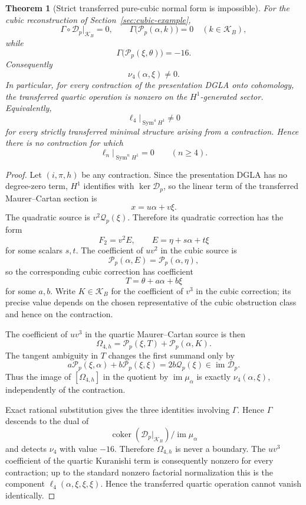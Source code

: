 \documentclass[11pt]{amsart}
\newtheorem{theorem}{Theorem}[section]
\newcommand{\coker}{\operatorname{coker}}
\newcommand{\cD}{\mathscr D}
\newcommand{\cQ}{\mathscr Q}
\newcommand{\cP}{\mathscr P}
\begin{document}
\begin{theorem}[Strict transferred pure-cubic normal form is impossible]\label{thm:strict-transfer-no-go}
For the cubic reconstruction of Section~\ref{sec:cubic-example},
\[
\Gamma\circ\cD_p|_{\mathcal K_B}=0,
\qquad
\Gamma\bigl(\cP_p(\alpha,k)\bigr)=0
\quad(k\in\mathcal K_B),
\]
while
\[
\boxed{
\Gamma\bigl(\cP_p(\xi,\theta)\bigr)=-16.
}
\]
Consequently
\[
\boxed{
\nu_4(\alpha,\xi)\ne0.
}
\]
In particular, for every contraction of the presentation DGLA onto cohomology, the transferred quartic operation is nonzero on the $H^1$-generated sector.  Equivalently,
\[
\boxed{
\ell_4\big|_{\operatorname{Sym}^4 H^1}\ne0
}
\]
for every strictly transferred minimal structure arising from a contraction.  Hence there is no contraction for which
\[
\ell_n\big|_{\operatorname{Sym}^nH^1}=0
\qquad(n\ge4).
\]
\end{theorem}

\begin{proof}
Let $(i,\pi,h)$ be any contraction.  Since the presentation DGLA has no degree-zero term, $H^1$ identifies with $\ker\cD_p$, so the linear term of the transferred Maurer--Cartan section is
\[
x=u\alpha+v\xi.
\]
The quadratic source is $v^2\cQ_p(\xi)$.  Therefore its quadratic correction has the form
\[
F_2=v^2E,
\qquad
E=\eta+s\alpha+t\xi
\]
for some scalars $s,t$.  The coefficient of $uv^2$ in the cubic source is
\[
\cP_p(\alpha,E)=\cP_p(\alpha,\eta),
\]
so the corresponding cubic correction has coefficient
\[
T=\theta+a\alpha+b\xi
\]
for some $a,b$.  Write $K\in\mathcal K_B$ for the coefficient of $v^3$ in the cubic correction; its precise value depends on the chosen representative of the cubic obstruction class and hence on the contraction.

The coefficient of $uv^3$ in the quartic Maurer--Cartan source is then
\[
\Omega_{4,h}
=
\cP_p(\xi,T)+\cP_p(\alpha,K).
\]
The tangent ambiguity in $T$ changes the first summand only by
\[
a\cP_p(\xi,\alpha)+b\cP_p(\xi,\xi)
=2b\cQ_p(\xi)\in\operatorname{im}\cD_p.
\]
Thus the image of $[\Omega_{4,h}]$ in the quotient by $\operatorname{im}\mu_\alpha$ is exactly $\nu_4(\alpha,\xi)$, independently of the contraction.

Exact rational substitution gives the three identities involving $\Gamma$.  Hence $\Gamma$ descends to the dual of
\[
\coker(\cD_p|_{\mathcal K_B})/\operatorname{im}\mu_\alpha
\]
and detects $\nu_4$ with value $-16$.  Therefore $\Omega_{4,h}$ is never a boundary.  The $uv^3$ coefficient of the quartic Kuranishi term is consequently nonzero for every contraction; up to the standard nonzero factorial normalization this is the component $\ell_4(\alpha,\xi,\xi,\xi)$.  Hence the transferred quartic operation cannot vanish identically.
\end{proof}
\end{document}
